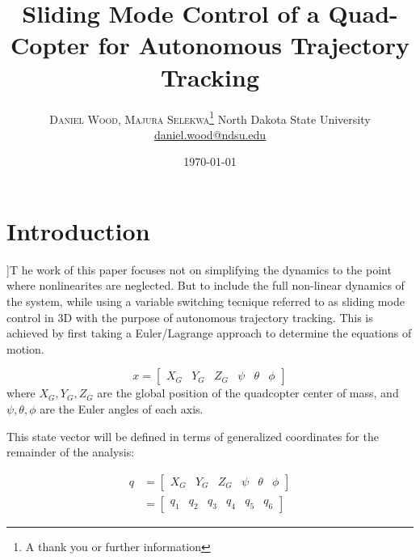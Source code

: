 \documentclass{article}
\title{Sliding Mode Control of a Quad-Copter for Autonomous Trajectory Tracking} %
\author{%
\textsc{Daniel Wood, Majura Selekwa}\thanks{A thank you or further information} %
\normalsize North Dakota State University \\ %
\normalsize \href{mailto:daniel.wood@ndsu.edu}{daniel.wood@ndsu.edu} %
}
\date{\today} %
\begin{document}
\maketitle

\tableofcontents



\section{Introduction}

]{T} he work of this paper focuses not on simplifying the dynamics to the point where nonlinearites are neglected. But to include the full non-linear dynamics of the system, while using a variable switching tecnique referred to as sliding mode control in 3D with the purpose of autonomous trajectory tracking. This is achieved by first taking a Euler/Lagrange approach to determine the equations of motion.


\begin{equation}
x=[\begin{array}{cccccc}
X_{G} & Y_{G} & Z_{G} & \psi & \theta & \phi\end{array}]
\end{equation}
where $X_{G},Y_{G},Z_{G}$ are the global position of the quadcopter center of mass, and $\psi,\theta,\phi$ are the Euler angles of each axis.

This state vector will be defined in terms of generalized coordinates for the remainder of the analysis:

\begin{equation}
\begin{split}
q &= [\begin{array}{cccccc}
X_{G} & Y_{G} & Z_{G} & \psi & \theta & \phi\end{array}] \\
&= [\begin{array}{cccccc}
q_{1} & q_{2} & q_{3} & q_{4} & q_{5} & q_{6}\end{array}]
\end{split}
\end{equation}
\end{document}
